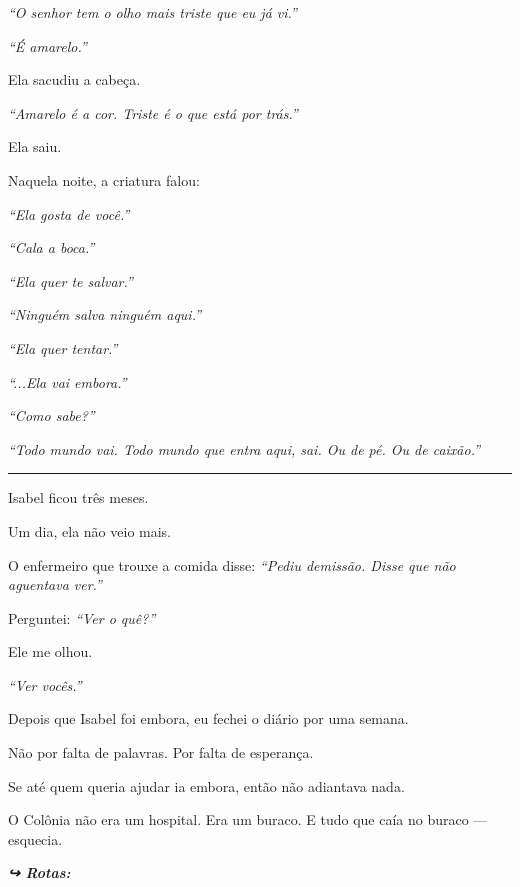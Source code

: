 \noindent \textit{\textquotedblleft{}O senhor tem o olho mais triste que eu já vi.\textquotedblright{}}

\noindent \textit{\textquotedblleft{}É amarelo.\textquotedblright{}}

\noindent Ela sacudiu a cabeça.

\noindent \textit{\textquotedblleft{}Amarelo é a cor. Triste é o que está por trás.\textquotedblright{}}

\noindent Ela saiu.

\noindent Naquela noite, a criatura falou:

\noindent \textit{\textquotedblleft{}Ela gosta de você.\textquotedblright{}}

\noindent \textit{\textquotedblleft{}Cala a boca.\textquotedblright{}}

\noindent \textit{\textquotedblleft{}Ela quer te salvar.\textquotedblright{}}

\noindent \textit{\textquotedblleft{}Ninguém salva ninguém aqui.\textquotedblright{}}

\noindent \textit{\textquotedblleft{}Ela quer tentar.\textquotedblright{}}

\noindent \textit{\textquotedblleft{}...Ela vai embora.\textquotedblright{}}

\noindent \textit{\textquotedblleft{}Como sabe?\textquotedblright{}}

\noindent \textit{\textquotedblleft{}Todo mundo vai. Todo mundo que entra aqui, sai. Ou de pé. Ou de caixão.\textquotedblright{}}

\vspace{0.5em}\noindent\rule{\textwidth}{0.5pt}\vspace{0.5em}

\noindent Isabel ficou três meses.

\noindent Um dia, ela não veio mais.

\noindent O enfermeiro que trouxe a comida disse: \textit{\textquotedblleft{}Pediu demissão. Disse que não aguentava ver.\textquotedblright{}}

\noindent Perguntei: \textit{\textquotedblleft{}Ver o quê?\textquotedblright{}}

\noindent Ele me olhou.

\noindent \textit{\textquotedblleft{}Ver vocês.\textquotedblright{}}

\noindent Depois que Isabel foi embora, eu fechei o diário por uma semana.

\noindent Não por falta de palavras.
Por falta de esperança.

\noindent Se até quem queria ajudar ia embora, então não adiantava nada.

\noindent O Colônia não era um hospital.
Era um buraco.
E tudo que caía no buraco --- esquecia.

\vspace{0.5em}
\noindent\textit{\textbf{↪ Rotas:}  \rotasep {}}